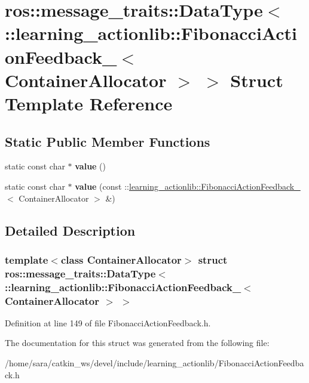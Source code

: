 \hypertarget{structros_1_1message__traits_1_1DataType_3_01_1_1learning__actionlib_1_1FibonacciActionFeedback_4b5000ca73b59c79b63e13e37ac0341d}{}\section{ros\+:\+:message\+\_\+traits\+:\+:Data\+Type$<$ \+:\+:learning\+\_\+actionlib\+:\+:Fibonacci\+Action\+Feedback\+\_\+$<$ Container\+Allocator $>$ $>$ Struct Template Reference}
\label{structros_1_1message__traits_1_1DataType_3_01_1_1learning__actionlib_1_1FibonacciActionFeedback_4b5000ca73b59c79b63e13e37ac0341d}
\subsection*{Static Public Member Functions}
\begin{DoxyCompactItemize}
\item 
\mbox{\label{structros_1_1message__traits_1_1DataType_3_01_1_1learning__actionlib_1_1FibonacciActionFeedback_4b5000ca73b59c79b63e13e37ac0341d_ade9b42dfa79d1e2aec802f88ccf9f210}} 
static const char $\ast$ {\bfseries value} ()
\item 
\mbox{\label{structros_1_1message__traits_1_1DataType_3_01_1_1learning__actionlib_1_1FibonacciActionFeedback_4b5000ca73b59c79b63e13e37ac0341d_a63500ab6b1a895575c5bae55d2442e5a}} 
static const char $\ast$ {\bfseries value} (const \+::\hyperlink{structlearning__actionlib_1_1FibonacciActionFeedback__}{learning\+\_\+actionlib\+::\+Fibonacci\+Action\+Feedback\+\_\+}$<$ Container\+Allocator $>$ \&)
\end{DoxyCompactItemize}


\subsection{Detailed Description}
\subsubsection*{template$<$class Container\+Allocator$>$\newline
struct ros\+::message\+\_\+traits\+::\+Data\+Type$<$ \+::learning\+\_\+actionlib\+::\+Fibonacci\+Action\+Feedback\+\_\+$<$ Container\+Allocator $>$ $>$}



Definition at line 149 of file Fibonacci\+Action\+Feedback.\+h.



The documentation for this struct was generated from the following file\+:\begin{DoxyCompactItemize}
\item 
/home/sara/catkin\+\_\+ws/devel/include/learning\+\_\+actionlib/Fibonacci\+Action\+Feedback.\+h\end{DoxyCompactItemize}
